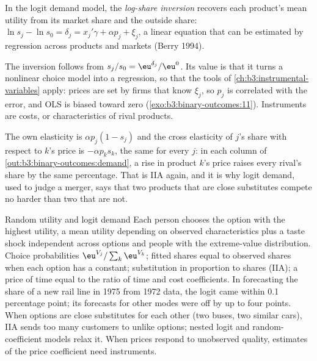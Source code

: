 \begin{definition}\label{def:b3:binary-outcomes:inversion}
In the logit demand model, the \emph{log-share inversion} recovers each
product's mean utility from its market share and the outside share: $\ln s_j -
\ln s_0 = \delta_j = x_j'\gamma + \alpha p_j + \xi_j$, a linear equation that can be
estimated by regression across products and markets (Berry 1994).
\end{definition}

The inversion follows from $s_j/s_0 = \eu^{\delta_j}/\eu^{0}$. Its value is
that it turns a nonlinear choice model into a regression, so that the tools of
\cref{ch:b3:instrumental-variables} apply: prices are set by firms that know
$\xi_j$, so $p_j$ is correlated with the error, and OLS is biased toward zero
(\cref{exo:b3:binary-outcomes:11}). Instruments are costs, or characteristics
of rival products.

\label{lst:b3:binary-outcomes:demand}

\label{out:b3:binary-outcomes:demand}

The own elasticity is $\alpha p_j(1 - s_j)$ and the cross elasticity of $j$'s
share with respect to $k$'s price is $-\alpha p_k s_k$, the same for every $j$:
in each column of \cref{out:b3:binary-outcomes:demand}, a rise in product
$k$'s price raises every rival's share by the same percentage. That is IIA again,
and it is why logit demand, used to judge a merger, says that two products
that are close substitutes compete no harder than two that are not.

\begin{model}{Random utility and logit demand}
\assumes Each person chooses the option with the highest utility, a mean
utility depending on observed characteristics plus a taste shock independent
across options and people with the extreme-value distribution.
\predicts Choice probabilities $\eu^{V_j}/\sum_k \eu^{V_k}$; fitted shares equal to
observed shares when each option has a constant; substitution in proportion to
shares (IIA); a price of time equal to the ratio of time and cost coefficients.
\tested In forecasting the share of a new rail line in 1975 from 1972 data, the
logit came within 0.1 percentage point; its forecasts for other modes were
off by up to four points.
\breaks When options are close substitutes for each other (two buses, two
similar cars), IIA sends too many customers to unlike options; nested logit and
random-coefficient models relax it. When prices respond to unobserved quality,
estimates of the price coefficient need instruments.
\end{model}

